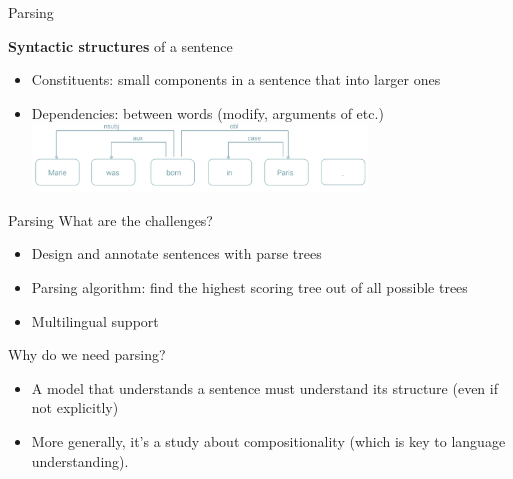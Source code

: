 \documentclass[usenames,dvipsnames,notes,11pt,aspectratio=169,hyperref={colorlinks=true, linkcolor=blue}]{beamer}
\begin{document}
\begin{frame}
    {Parsing}

        \textbf{Syntactic structures} of a sentence 
            \begin{itemize}
                \item Constituents: small components in a sentence that  into larger ones\\[1ex]
                \pause
                \item Dependencies:  between words (modify, arguments of etc.)\\[1ex]
                    \includegraphics[width=0.7\textwidth]{figures/dep-parse}
            \end{itemize}
\end{frame}

\begin{frame}
    {Parsing}
    What are the challenges?\\\pause
    \begin{itemize}
        \item Design and annotate sentences with parse trees 
        \item Parsing algorithm: find the highest scoring tree out of all possible trees
        \item Multilingual support
    \end{itemize}

    \pause\bigskip
    Why do we need parsing?\\
    \begin{itemize}
        \item A model that understands a sentence must understand its structure (even if not explicitly)
        \item More generally, it's a study about compositionality (which is key to language understanding).
    \end{itemize}
\end{frame}
\end{document}
